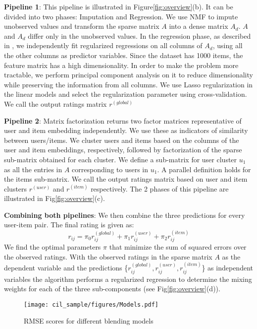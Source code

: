\documentclass[10pt,conference,compsocconf]{IEEEtran}
\begin{document}
\textbf{Pipeline 1}:
This pipeline is illustrated in Figure\ref{fig:overview}(b). It can be divided into two phases: Imputation and Regression. We use NMF to impute unobserved values and transform the sparse matrix $A$ into a dense matrix $A_d$. $A$ and $A_d$ differ only in the unobserved values. In the regression phase, as described in \cite{RSH}, we independently fit regularized regressions on all columns of $A_d$, using all the other columns as predictor variables. Since the dataset has 1000 items, the feature matrix has a high dimensionality. In order to make the problem more tractable, we perform principal component analysis on it to reduce dimensionality while preserving the information from all columns. We use Lasso regularization in the linear models and select the regularization parameter using cross-validation. We call the output ratings matrix $r^{(global)}$

\textbf{Pipeline 2}:
Matrix factorization returns two factor matrices representative of user and item embedding independently. We use these as indicators of similarity between users/items. We cluster users and items based on the columns of the user and item embeddings, respectively, followed by factorization of the sparse sub-matrix obtained for each cluster. We define a sub-matrix for user cluster $u_1$ as all the entries in $A$ corresponding to users in $u_1$. A parallel definition holds for the items sub-matrix. We call the output ratings matrix based on user and item clusters $r^{(user)}$ and $r^{(item)}$ respectively. The 2 phases of this pipeline are illustrated in Fig\ref{fig:overview}(c).


\textbf{Combining both pipelines}: We then combine the three predictions for every user-item pair. The final rating is given as:
$$ r_{ij} =  \pi_{0}r_{ij}^{(global)} + \pi_{1}r_{ij}^{(user)} + \pi_{2}r_{ij}^{(item)}$$
We find the optimal parameters $\pi$ that minimize the sum of squared errors over the observed ratings.  With the observed ratings in the sparse matrix $A$ as the dependent variable and the predictions \{$r_{ij}^{(global)},r_{ij}^{(user)},r_{ij}^{(item)}$\} as independent variables the algorithm performs a regularized regression to determine the mixing weights for each of the three sub-components (see Fig\ref{fig:overview}(d)). 



\begin{figure}[h]
  \centering
  \texttt{[image: cil\_sample/figures/Models.pdf]}
  \caption{RMSE scores for different blending models}
  \label{fig:models}
\end{figure}
\end{document}
